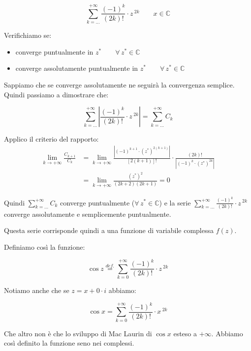 \documentclass[../dimostrazioni]{subfiles}
\begin{document}
                \[  \sum_{k=\dots}^{+\infty} \frac{(-1)^k}{(2k)!} \cdot z\,^{2k} \qquad x \in \mathbb{C}  \]

                Verifichiamo se:
                \begin{itemize}
                    \item converge puntualmente in \(z^* \qquad \forall \, z^*  \in \mathbb{C}\)
                    \item converge assolutamente puntualmente in \(z^* \qquad \forall \, z^*  \in \mathbb{C}\)
                \end{itemize}
            
                Sappiamo che se converge assolutamente ne seguirà la convergenza semplice. Quindi passiamo a dimostrare che:

                \[  \sum_{k=\dots}^{+\infty} \left| \frac{(-1)^k}{(2k)!} \cdot z\,^{2k} \right| = \sum_{k=\dots}^{+\infty} C_k \]

                Applico il criterio del rapporto: %
                \begin{align*}
                    \lim_{k \to +\infty} \frac{C_{k+1}}{C_k} &= \lim_{k \to +\infty} \frac{\left| (-1)^{k+1} \cdot (z^*)^{2(k+1)}\right|}{\left[2(k+1)\right]!} \cdot \frac{\left(2k\right)!}{\left| (-1)^k \cdot (z^*)^{2k}\right|} \\
                    &= \lim_{k \to +\infty} \frac{(z^*)^2}{(2k+2)(2k+1)} = 0
                \end{align*}

                Quindi \(\sum_{k=\dots}^{+\infty} C_k\) converge puntualmente (\(\forall \, z^* \in \mathbb{C}\)) 
                e la serie  \(\sum_{k=\dots}^{+\infty} \frac{(-1)^k}{(2k)!} \cdot z\,^{2k}\) converge assolutamente e semplicemente puntualmente.

                Questa serie corrisponde quindi a una funzione di variabile complessa \(f(z)\).

                Definiamo così la funzione:

                \[  \cos z \stackrel{def.}{=} \sum_{k=0}^{+\infty} \frac{(-1)^k}{(2k)!} \cdot z\,^{2k}    \]

                Notiamo anche che se \(z = x + 0 \cdot i\) abbiamo:

                \[  \cos x = \sum_{k=0}^{+\infty} \frac{(-1)^k}{(2k)!} \cdot x\,^{2k} \]

                Che altro non è che lo sviluppo di Mac Laurin di \(\cos x\) esteso a \(+\infty\). 
                Abbiamo così definito la funzione seno nei complessi.
\end{document}
